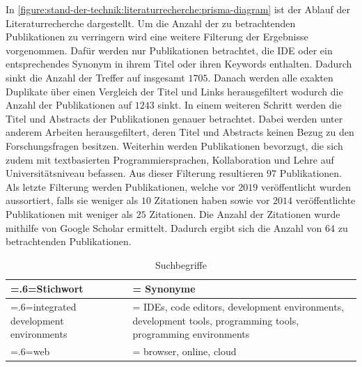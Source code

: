 In \autoref{figure:stand-der-technik:literaturrecherche:prisma-diagram} ist der Ablauf der Literaturrecherche dargestellt. Um die Anzahl der zu betrachtenden Publikationen zu verringern wird eine weitere Filterung der Ergebnisse vorgenommen. Dafür werden nur Publikationen betrachtet, die IDE oder ein entsprechendes Synonym in ihrem Titel oder ihren Keywords enthalten. Dadurch sinkt die Anzahl der Treffer auf insgesamt $1705$. Danach werden alle exakten Duplikate über einen Vergleich der Titel und Links herausgefiltert wodurch die Anzahl der Publikationen auf $1243$ sinkt. In einem weiteren Schritt werden die Titel und Abstracts der Publikationen genauer betrachtet. Dabei werden unter anderem Arbeiten herausgefiltert, deren Titel und Abstracts keinen Bezug zu den Forschungsfragen besitzen. Weiterhin werden Publikationen bevorzugt, die sich zudem mit textbasierten Programmiersprachen, Kollaboration und Lehre auf Universitätsniveau befassen. Aus dieser Filterung resultieren $97$ Publikationen. Als letzte Filterung werden Publikationen, welche vor $2019$ veröffentlicht wurden aussortiert, falls sie weniger als $10$ Zitationen haben sowie vor $2014$ veröffentlichte Publikationen mit weniger als $25$ Zitationen. Die Anzahl der Zitationen wurde mithilfe von Google Scholar ermittelt. Dadurch ergibt sich die Anzahl von $64$ zu betrachtenden Publikationen.

\begin{table}[tbp]
    \centering
    \begin{tabularx}{\textwidth}{>{\hsize=.6\hsize\linewidth=\hsize}X
            >{\hsize=1.4\hsize\linewidth=\hsize}X}
        \toprule
        Stichwort                           & Synonyme                                                                                                     \\
        \midrule
        integrated development environments & IDEs, code editors, development environments, development tools, programming tools, programming environments \\
        web                                 & browser, online, cloud                                                                                       \\
        \bottomrule
    \end{tabularx}
    \caption{Suchbegriffe}
    \label{table:search-terms}
\end{table}

